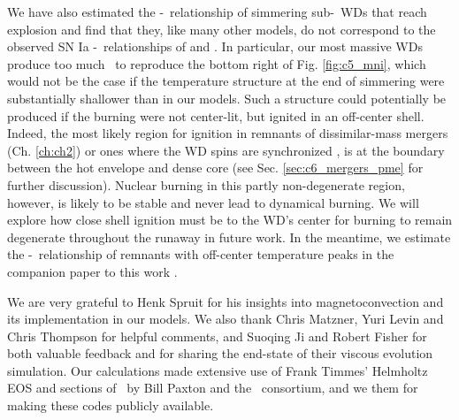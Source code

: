 
We have also estimated the \Mtot-\MNi\ relationship of simmering sub-\Mch\ WDs that reach explosion and find that they, like many other models, do not correspond to the observed SN Ia \Mtot-\MNi\ relationships of \cite{scalzrs14} and \cite{chil+15}.  In particular, our most massive WDs produce too much \Ni\ to reproduce the bottom right of Fig. \ref{fig:c5_mni}, which would not be the case if the temperature structure at the end of simmering were substantially shallower than in our models.  Such a structure could potentially be produced if {\charles the burning were not center-lit, but ignited in an off-center shell.  Indeed, the most likely region for ignition in remnants of dissimilar-mass mergers (Ch. \ref{ch:ch2}) or ones where the WD spins are synchronized \citep{rask+12, dan+14}, is at the boundary between the hot envelope and dense core (see Sec. \ref{sec:c6_mergers_pme} for further discussion).  Nuclear burning in this partly non-degenerate region, however, is likely to be stable \citep{shen+12, schw+12, schw+16} and never lead to dynamical burning.  We will explore how close shell ignition must be to the WD's center for burning to remain degenerate throughout the runaway in future work.  In the meantime, we estimate the \Mtot-\MNi\ relationship of remnants with off-center temperature peaks in the companion paper to this work \citep{herizv16}.}

\vspace{5mm}
We are very grateful to Henk Spruit for his insights into magnetoconvection and its implementation in our models.  We also thank Chris Matzner, Yuri Levin and Chris Thompson for helpful comments, and Suoqing Ji and Robert Fisher for both valuable feedback and for sharing the end-state of their viscous evolution simulation.  Our calculations made extensive use of Frank Timmes' Helmholtz EOS and sections of \mesa\ by Bill Paxton and the \mesa\ consortium, and we them for making these codes publicly available.  




